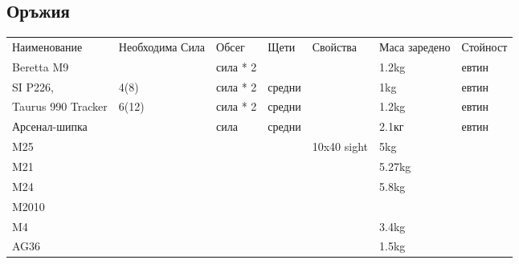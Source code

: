 \subsection{Оръжия}
\begin{tabular}{p{2cm} | p{2cm} | p{2cm} | p{2cm} | p{2cm} | p{2cm} | p{2cm}}
Наименование          & Необходима Сила      & Обсег      & Щети       & Свойства       & Маса заредено & Стойност         \\
Beretta M9            &                      & сила * 2   &            &                & 1.2kg         & евтин            \\  %
SI P226,              & 4(8)                 & сила * 2   & средни     &                & 1kg           & евтин            \\  %
Taurus 990 Tracker    & 6(12)                & сила * 2   & средни     &                & 1.2kg         & евтин            \\  %
Арсенал-шипка         &                      & сила       & средни     &                & 2.1кг         & евтин            \\  %
M25                   &                      &            &            & 10x40 sight    & 5kg           &                  \\  %
M21                   &                      &            &            &                & 5.27kg        &                  \\  %
M24                   &                      &            &            &                & 5.8kg         &                  \\  %
M2010                 &                      &            &            &                &               &                  \\
M4                    &                      &            &            &                & 3.4kg         &                  \\  %
AG36                  &                      &            &            &                & 1.5kg         &                  \\  %

\end{tabular}
